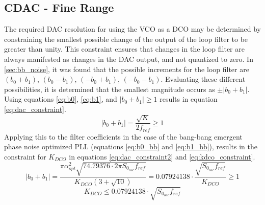 	\FloatBarrier
	\subsection{CDAC - Fine Range}
	The required DAC resolution for using the VCO as a DCO may be determined by constraining the smallest possible change of the output of the loop filter to be greater than unity. This constraint ensures that changes in the loop filter are always manifested as changes in the DAC output, and not quantized to zero. In \ref{sec:bb_noise}, it was found that the possible increments for the loop filter are $(b_0+b_1 )$, $( b_0-b_1 )$, $( -b_0+b_1 )$, $( -b_0-b_1 )$. Evaluating these different possibilities, it is determined that the smallest magnitude occurs as $\pm|b_0+b_1|$. Using equations \ref{eq:b0}, \ref{eq:b1}, and  $|b_0+b_1| \geq 1$ results in equation \ref{eq:dac_constraint}.
	\begin{equation}\label{eq:dac_constraint}
		|b_0+b_1| = \frac{\sqrt{K}}{2f_{ref}} \geq 1
	\end{equation}
	Applying this to the filter coefficients in the case of the bang-bang emergent phase noise optimized PLL (equations \ref{eq:b0_bb} and \ref{eq:b1_bb}), results in the constraint for $K_{DCO}$ in equations  \ref{eq:dac_constraint2} and \ref{eq:kdco_constraint}.
	\begin{equation}\label{eq:dac_constraint2}
		|b_0+b_1| = \frac{\pi\alpha_{opt}^2\sqrt{74.79376\cdot2\pi S_{0_{osc}} f_{ref}}}{K_{DCO}(3+\sqrt{10})} = 0.07924138\cdot \frac{ \sqrt{S_{0_{osc}} f_{ref}}}{K_{DCO}} \geq 1
	\end{equation}
	\begin{equation}\label{eq:kdco_constraint}
		K_{DCO} \leq 0.07924138\cdot \sqrt{S_{0_{osc}} f_{ref}}
	\end{equation}

